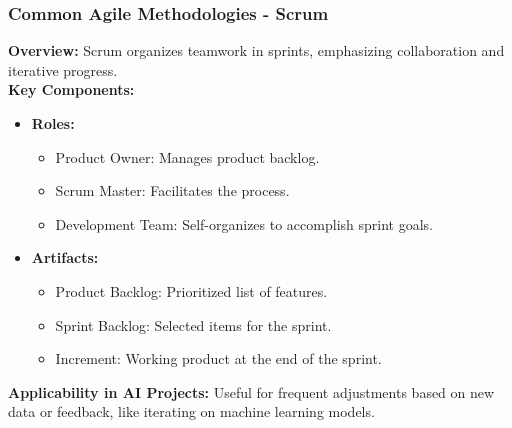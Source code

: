 \documentclass{beamer}
\begin{document}
\begin{frame}[fragile]
    \frametitle{Common Agile Methodologies - Scrum}
    \textbf{Overview:}  
    Scrum organizes teamwork in sprints, emphasizing collaboration and iterative progress. \\[1em]
    
    \textbf{Key Components:}
    \begin{itemize}
        \item \textbf{Roles:}
        \begin{itemize}
            \item Product Owner: Manages product backlog.
            \item Scrum Master: Facilitates the process.
            \item Development Team: Self-organizes to accomplish sprint goals.
        \end{itemize}
        
        \item \textbf{Artifacts:}
        \begin{itemize}
            \item Product Backlog: Prioritized list of features.
            \item Sprint Backlog: Selected items for the sprint.
            \item Increment: Working product at the end of the sprint.
        \end{itemize}
    \end{itemize}

    \textbf{Applicability in AI Projects:}  
    Useful for frequent adjustments based on new data or feedback, like iterating on machine learning models.
\end{frame}
\end{document}

